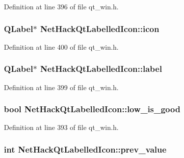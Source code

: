 Definition at line 396 of file qt\+\_\+win.\+h.

\hypertarget{classNetHackQtLabelledIcon_a4e33054b1434bdc8975812ee48b349d1}{
\subsubsection[{icon}]{\setlength{\rightskip}{0pt plus 5cm}Q\+Label$\ast$ Net\+Hack\+Qt\+Labelled\+Icon\+::icon\hspace{0.3cm}{\ttfamily [private]}}}\label{classNetHackQtLabelledIcon_a4e33054b1434bdc8975812ee48b349d1}


Definition at line 400 of file qt\+\_\+win.\+h.

\hypertarget{classNetHackQtLabelledIcon_aa2a1e63d7c0ded20b3327c57a0f2b859}{
\subsubsection[{label}]{\setlength{\rightskip}{0pt plus 5cm}Q\+Label$\ast$ Net\+Hack\+Qt\+Labelled\+Icon\+::label\hspace{0.3cm}{\ttfamily [private]}}}\label{classNetHackQtLabelledIcon_aa2a1e63d7c0ded20b3327c57a0f2b859}


Definition at line 399 of file qt\+\_\+win.\+h.

\hypertarget{classNetHackQtLabelledIcon_a63f66d9df2dc8bef4fcac182d4edf467}{
\subsubsection[{low\+\_\+is\+\_\+good}]{\setlength{\rightskip}{0pt plus 5cm}bool Net\+Hack\+Qt\+Labelled\+Icon\+::low\+\_\+is\+\_\+good\hspace{0.3cm}{\ttfamily [private]}}}\label{classNetHackQtLabelledIcon_a63f66d9df2dc8bef4fcac182d4edf467}


Definition at line 393 of file qt\+\_\+win.\+h.

\hypertarget{classNetHackQtLabelledIcon_ae3783d07960d74d27b79e5a1266afa5d}{
\subsubsection[{prev\+\_\+value}]{\setlength{\rightskip}{0pt plus 5cm}int Net\+Hack\+Qt\+Labelled\+Icon\+::prev\+\_\+value\hspace{0.3cm}{\ttfamily [private]}}}\label{classNetHackQtLabelledIcon_ae3783d07960d74d27b79e5a1266afa5d}


